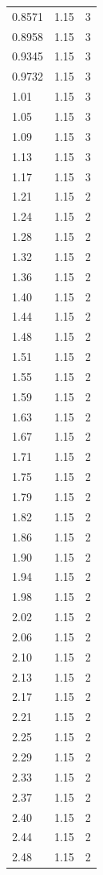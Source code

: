 \begin{longtable}{lrr}
  0.8571 & 1.15 & 3 \\
  0.8958 & 1.15 & 3 \\
  0.9345 & 1.15 & 3 \\
  0.9732 & 1.15 & 3 \\
  1.01 & 1.15 & 3 \\
  1.05 & 1.15 & 3 \\
  1.09 & 1.15 & 3 \\
  1.13 & 1.15 & 3 \\
  1.17 & 1.15 & 3 \\
  1.21 & 1.15 & 2 \\
  1.24 & 1.15 & 2 \\
  1.28 & 1.15 & 2 \\
  1.32 & 1.15 & 2 \\
  1.36 & 1.15 & 2 \\
  1.40 & 1.15 & 2 \\
  1.44 & 1.15 & 2 \\
  1.48 & 1.15 & 2 \\
  1.51 & 1.15 & 2 \\
  1.55 & 1.15 & 2 \\
  1.59 & 1.15 & 2 \\
  1.63 & 1.15 & 2 \\
  1.67 & 1.15 & 2 \\
  1.71 & 1.15 & 2 \\
  1.75 & 1.15 & 2 \\
  1.79 & 1.15 & 2 \\
  1.82 & 1.15 & 2 \\
  1.86 & 1.15 & 2 \\
  1.90 & 1.15 & 2 \\
  1.94 & 1.15 & 2 \\
  1.98 & 1.15 & 2 \\
  2.02 & 1.15 & 2 \\
  2.06 & 1.15 & 2 \\
  2.10 & 1.15 & 2 \\
  2.13 & 1.15 & 2 \\
  2.17 & 1.15 & 2 \\
  2.21 & 1.15 & 2 \\
  2.25 & 1.15 & 2 \\
  2.29 & 1.15 & 2 \\
  2.33 & 1.15 & 2 \\
  2.37 & 1.15 & 2 \\
  2.40 & 1.15 & 2 \\
  2.44 & 1.15 & 2 \\
  2.48 & 1.15 & 2 \\

\end{longtable}
